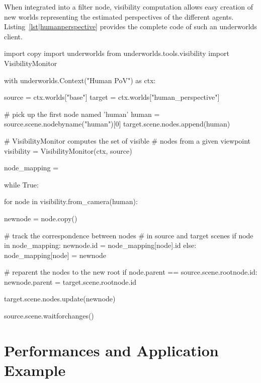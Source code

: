 \documentclass[conference]{IEEEtran}
\newcommand{\uwds}{{\sc underworlds}\xspace}
\begin{document}
When integrated into a filter node, visibility computation allows easy
creation of new worlds representing the estimated perspectives of the different
agents. Listing~\ref{lst|humanperspective} provides the complete code of such an
\uwds client.


\begin{listing}[h!]
\begin{pythoncode}
import copy
import underworlds
from underworlds.tools.visibility import VisibilityMonitor

with underworlds.Context("Human PoV") as ctx:

    source = ctx.worlds["base"]
    target = ctx.worlds["human_perspective"]

    # pick up the first node named 'human'
    human = source.scene.nodebyname("human")[0]
    target.scene.nodes.append(human)

    # VisibilityMonitor computes the set of visible 
    # nodes from a given viewpoint
    visibility = VisibilityMonitor(ctx, source)

    node_mapping = {}

    while True:

        for node in visibility.from_camera(human):

            newnode = node.copy()

            # track the correspondence between nodes
            # in source and target scenes
            if node in node_mapping:
                newnode.id = node_mapping[node].id
            else:
                node_mapping[node] = newnode

            # reparent the nodes to the new root
            if node.parent == source.scene.rootnode.id:
                newnode.parent = target.scene.rootnode.id

            target.scene.nodes.update(newnode)

        source.scene.waitforchanges()

\end{pythoncode}
    \caption{Example of an \uwds client that creates a world named {\tt
    human\_perspective} from a source world {\tt base} by only updating objects
    that are in the field of view of the human. As such, {\tt human\_perspective} is
    a real-time model of the human perspective on the scene.}

    \label{lst|humanperspective}
\end{listing}


\section{Performances and Application Example}
\label{application}
\end{document}
